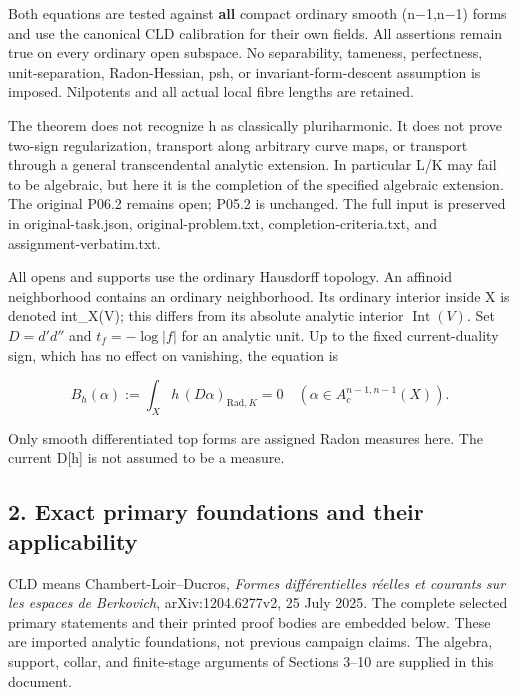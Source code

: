 \documentclass[
  10pt,
]{article}
\begin{document}
Both equations are tested against \textbf{all} compact ordinary smooth
(n\ensuremath{-}1,n\ensuremath{-}1) forms and use the canonical CLD calibration for their own
fields. All assertions remain true on every ordinary open subspace. No
separability, tameness, perfectness, unit-separation, Radon-Hessian,
psh, or invariant-form-descent assumption is imposed. Nilpotents and all
actual local fibre lengths are retained.

The theorem does not recognize h as classically pluriharmonic. It does
not prove two-sign regularization, transport along arbitrary curve maps,
or transport through a general transcendental analytic extension. In
particular L/K may fail to be algebraic, but here it is the completion
of the specified algebraic extension. The original P06.2 remains open;
P05.2 is unchanged. The full input is preserved in original-task.json,
original-problem.txt, completion-criteria.txt, and
assignment-verbatim.txt.

All opens and supports use the ordinary Hausdorff topology. An affinoid
neighborhood contains an ordinary neighborhood. Its ordinary interior
inside X is denoted int\_X(V); this differs from its absolute analytic
interior \(\operatorname{Int}(V)\). Set \(D=d'd''\) and \(t_f=-\log|f|\) for an analytic unit. Up to the fixed current-duality sign, which has no effect
on vanishing, the equation is

\[
 B_h(\alpha):=\int_X h\,(D\alpha)_{\mathrm{Rad},K}=0
 \quad(\alpha\in A_c^{n-1,n-1}(X)).                         \tag{1}
\]

Only smooth differentiated top forms are assigned Radon measures here.
The current D{[}h{]} is not assumed to be a measure.

\subsection{2. Exact primary foundations and their
applicability}\label{exact-primary-foundations-and-their-applicability}

CLD means Chambert-Loir--Ducros, \emph{Formes différentielles réelles et
courants sur les espaces de Berkovich}, arXiv:1204.6277v2, 25 July 2025.
The complete selected primary statements and their printed proof bodies
are embedded below. These are imported analytic foundations, not
previous campaign claims. The algebra, support, collar, and finite-stage
arguments of Sections 3--10 are supplied in this document.
\end{document}
